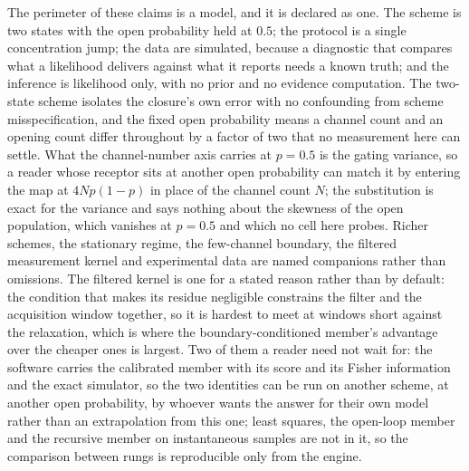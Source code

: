 The perimeter of these claims is a model, and it is declared as one. The scheme is two states with the open probability held at $0.5$; the protocol is a single concentration jump; the data are simulated, because a diagnostic that compares what a likelihood delivers against what it reports needs a known truth; and the inference is likelihood only, with no prior and no evidence computation. The two-state scheme isolates the closure's own error with no confounding from scheme misspecification, and the fixed open probability means a channel count and an opening count differ throughout by a factor of two that no measurement here can settle. What the channel-number axis carries at $p=0.5$ is the gating variance, so a reader whose receptor sits at another open probability can match it by entering the map at $4Np(1-p)$ in place of the channel count $N$; the substitution is exact for the variance and says nothing about the skewness of the open population, which vanishes at $p=0.5$ and which no cell here probes. Richer schemes, the stationary regime, the few-channel boundary, the filtered measurement kernel and experimental data are named companions rather than omissions. The filtered kernel is one for a stated reason rather than by default: the condition that makes its residue negligible constrains the filter and the acquisition window together, so it is hardest to meet at windows short against the relaxation, which is where the boundary-conditioned member's advantage over the cheaper ones is largest.
Two of them a reader need not wait for: the software carries the calibrated member with its score and its Fisher information and the exact simulator, so the two identities can be run on another scheme, at another open probability, by whoever wants the answer for their own model rather than an extrapolation from this one; least squares, the open-loop member and the recursive member on instantaneous samples are not in it, so the comparison between rungs is reproducible only from the engine.
